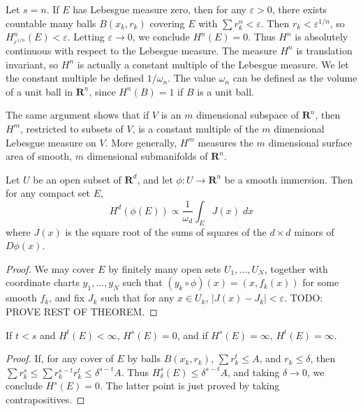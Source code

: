\begin{example}
	Let $s = n$. If $E$ has Lebesgue measure zero, then for any $\varepsilon > 0$, there exists countable many balls $B(x_k,r_k)$ covering $E$ with $\sum r_k^n < \varepsilon$. Then $r_k < \varepsilon^{1/n}$, so $H^n_{\varepsilon^{1/n}}(E) < \varepsilon$. Letting $\varepsilon \to 0$, we conclude $H^n(E) = 0$. Thus $H^n$ is absolutely continuous with respect to the Lebesgue measure. The measure $H^n$ is translation invariant, so $H^n$ is actually a constant multiple of the Lebesgue measure. We let the constant multiple be defined $1/\omega_n$. The value $\omega_n$ can be defined as the volume of a unit ball in $\mathbf{R}^n$, since $H^n(B) = 1$ if $B$ is a unit ball.
\end{example}

The same argument shows that if $V$ is an $m$ dimensional subspace of $\mathbf{R}^n$, then $H^m$, restricted to subsets of $V$, is a constant multiple of the $m$ dimensional Lebesgue measure on $V$. More generally, $H^m$ measures the $m$ dimensional surface area of smooth, $m$ dimensional submanifolds of $\mathbf{R}^n$.

\begin{theorem}
	Let $U$ be an open subset of $\mathbf{R}^d$, and let $\phi: U \to \mathbf{R}^n$ be a smooth immersion. Then for any compact set $E$,
	\[ H^d(\phi(E)) \propto \frac{1}{\omega_d} \int_E J(x)\; dx \]
	where $J(x)$ is the square root of the sums of squares of the $d \times d$ minors of $D\phi(x)$.
\end{theorem}
\begin{proof}
	We may cover $E$ by finitely many open sets $U_1, \dots, U_N$, together with coordinate charts $y_1, \dots, y_N$ such that $(y_k \circ \phi)(x) = (x,f_k(x))$ for some smooth $f_k$, and fix $J_k$ such that for any $x \in U_k$, $|J(x) - J_k| < \varepsilon$. TODO: PROVE REST OF THEOREM.
\end{proof}

\begin{lemma}
	If $t < s$ and $H^t(E) < \infty$, $H^s(E) = 0$, and if $H^s(E) = \infty$, $H^t(E) = \infty$.
\end{lemma}
\begin{proof}
	If, for any cover of $E$ by balls $B(x_k,r_k)$, $\sum r_k^t \leq A$, and $r_k \leq \delta$, then $\sum r_k^s \leq \sum r_k^{s-t} r_k^t \leq \delta^{s-t} A$. Thus $H^s_\delta(E) \leq \delta^{s-t} A $, and taking $\delta \to 0$, we conclude $H^s(E) = 0$. The latter point is just proved by taking contrapositives.
\end{proof}

